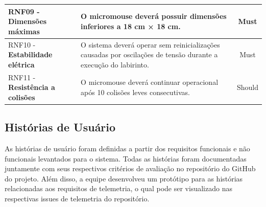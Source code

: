 \begin{center}
\begin{longtable}{|p{5.5cm}|p{8cm}|c|}
    RNF09 - \textbf{Dimensões máximas} & O micromouse deverá possuir dimensões inferiores a 18 cm × 18 cm. & Must \\ \hline

    RNF10 - \textbf{Estabilidade elétrica} & O sistema deverá operar sem reinicializações causadas por oscilações de tensão durante a execução do labirinto. & Must \\ \hline

    RNF11 - \textbf{Resistência a colisões} & O micromouse deverá continuar operacional após 10 colisões leves consecutivas. & Should \\ \hline

    \end{longtable}
    \end{center}

    \subsection{Histórias de Usuário}
      As histórias de usuário foram definidas a partir dos requisitos funcionais e não funcionais levantados para o sistema. Todas as histórias foram documentadas juntamente com seus respectivos critérios de avaliação no repositório do GitHub do projeto. Além disso, a equipe desenvolveu um protótipo para as histórias relacionadas aos requisitos de telemetria, o qual pode ser visualizado nas respectivas issues de telemetria do repositório.
